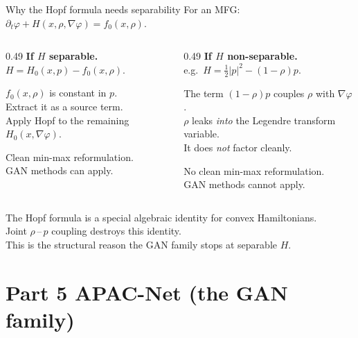 \documentclass[10pt,aspectratio=169]{beamer}
\newcommand{\xmark}{\textcolor{accent}{\ding{55}}}
\newcommand{\teal}[1]{\textcolor{kaustteal}{#1}}
\begin{document}
\begin{frame}{Why the Hopf formula needs separability}
For an MFG: \;$\partial_t\varphi + H(x,\rho,\nabla\varphi) = f_0(x,\rho)$.

\medskip
\begin{columns}[T]
\begin{column}{0.49\textwidth}
\textbf{If $H$ separable.}\\
$H = H_0(x,p) - f_0(x,\rho)$.

\smallskip
$f_0(x,\rho)$ is constant in $p$.\\
Extract it as a source term.\\
Apply Hopf to the remaining $H_0(x,\nabla\varphi)$.

\smallskip
\teal{Clean min-max reformulation.}\\
GAN methods can apply.
\end{column}
\begin{column}{0.49\textwidth}
\textbf{If $H$ non-separable.}\\
e.g.\ $H = \tfrac12|p|^2 - (1-\rho)p$.

\smallskip
The term $(1-\rho)p$ couples $\rho$ with $\nabla\varphi$.\\
$\rho$ leaks \emph{into} the Legendre transform variable.\\
It does \emph{not} factor cleanly.

\smallskip
\alert{No clean min-max reformulation.}\\
GAN methods \xmark\;cannot apply.
\end{column}
\end{columns}

\medskip
\begin{idea}[title=The structural barrier]
The Hopf formula is a special algebraic identity for convex
Hamiltonians.\\
Joint $\rho$\,--\,$p$ coupling \alert{destroys} this identity.\\
This is the structural reason the GAN family stops at separable $H$.
\end{idea}
\end{frame}

\section{Part 5 \;\textbar\; APAC-Net (the GAN family)}
\end{document}
